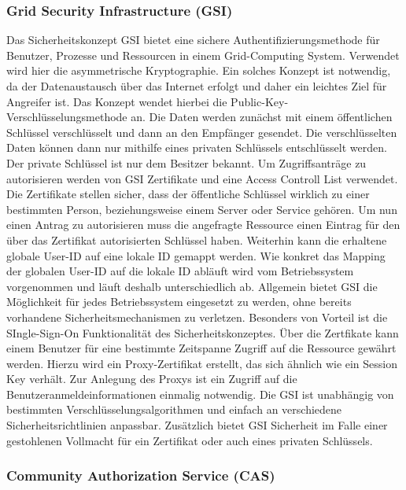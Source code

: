 \documentclass[utf8,biblatex]{lni}
\begin{document}
\subsubsection{Grid Security Infrastructure (GSI)}
 Das Sicherheitskonzept GSI bietet eine sichere Authentifizierungsmethode für Benutzer, Prozesse und Ressourcen in einem Grid-Computing System. Verwendet wird hier die asymmetrische Kryptographie.
 Ein solches Konzept ist notwendig, da der Datenaustausch über das Internet erfolgt und daher ein leichtes Ziel für Angreifer ist. Das Konzept wendet hierbei die 
 Public-Key-Verschlüsselungsmethode an. Die Daten werden zunächst mit einem öffentlichen Schlüssel verschlüsselt und dann an den Empfänger gesendet. Die verschlüsselten Daten können dann nur mithilfe
 eines privaten Schlüssels entschlüsselt werden. Der private Schlüssel ist nur dem Besitzer bekannt. Um Zugriffsanträge zu autorisieren werden von GSI Zertifikate und 
 eine Access Controll List verwendet. Die Zertifikate stellen sicher, dass der öffentliche Schlüssel wirklich zu einer bestimmten Person, beziehungsweise einem Server oder Service gehören. 
 Um nun einen Antrag zu autorisieren muss die angefragte Ressource einen Eintrag für den über das Zertifikat autorisierten Schlüssel haben. Weiterhin kann die erhaltene globale User-ID auf 
 eine lokale ID gemappt werden. Wie konkret das Mapping der globalen User-ID auf die lokale ID abläuft wird vom Betriebssystem vorgenommen und läuft deshalb unterschiedlich ab.
 Allgemein bietet GSI die Möglichkeit für jedes Betriebssystem eingesetzt zu werden, ohne bereits vorhandene Sicherheitsmechanismen zu verletzen. Besonders von Vorteil ist die 
 SIngle-Sign-On Funktionalität des Sicherheitskonzeptes. Über die Zertfikate kann einem Benutzer für eine bestimmte Zeitspanne Zugriff auf die Ressource gewährt werden. Hierzu wird ein Proxy-Zertifikat erstellt, das
 sich ähnlich wie ein Session Key verhält. Zur Anlegung des Proxys ist ein Zugriff auf die Benutzeranmeldeinformationen einmalig notwendig. Die GSI ist unabhängig von bestimmten Verschlüsselungsalgorithmen
 und einfach an verschiedene Sicherheitsrichtlinien anpassbar. Zusätzlich bietet GSI Sicherheit im Falle einer gestohlenen Vollmacht für ein Zertifikat oder auch eines privaten Schlüssels.
 \citet{Muraru.o.J}\citet{Epting.2002}

\subsubsection{Community Authorization Service (CAS)}
\end{document}
